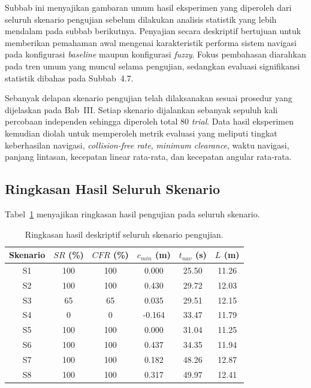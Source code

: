 Subbab ini menyajikan gambaran umum hasil eksperimen yang diperoleh dari seluruh skenario pengujian sebelum dilakukan analisis statistik yang lebih mendalam pada subbab berikutnya. Penyajian secara deskriptif bertujuan untuk memberikan pemahaman awal mengenai karakteristik performa sistem navigasi pada konfigurasi \textit{baseline} maupun konfigurasi \textit{fuzzy}. Fokus pembahasan diarahkan pada tren umum yang muncul selama pengujian, sedangkan evaluasi signifikansi statistik dibahas pada Subbab~4.7.

Sebanyak delapan skenario pengujian telah dilaksanakan sesuai prosedur yang dijelaskan pada Bab~III. Setiap skenario dijalankan sebanyak sepuluh kali percobaan independen sehingga diperoleh total 80 \textit{trial}. Data hasil eksperimen kemudian diolah untuk memperoleh metrik evaluasi yang meliputi tingkat keberhasilan navigasi, \textit{collision-free rate}, \textit{minimum clearance}, waktu navigasi, panjang lintasan, kecepatan linear rata-rata, dan kecepatan angular rata-rata.

\subsection{Ringkasan Hasil Seluruh Skenario}

Tabel~\ref{tab:ringkasan_hasil_deskriptif} menyajikan ringkasan hasil pengujian pada seluruh skenario.

\begin{table}[H]
\centering
\caption{Ringkasan hasil deskriptif seluruh skenario pengujian.}
\label{tab:ringkasan_hasil_deskriptif}
\begin{tabular}{cccccc}
\toprule
Skenario &
$SR$ (\%) &
$CFR$ (\%) &
$c_{min}$ (m) &
$t_{nav}$ (s) &
$L$ (m) \\
\midrule
S1 & 100 & 100 & 0.000 & 25.50 & 11.26 \\
S2 & 100 & 100 & 0.430 & 29.72 & 12.03 \\
S3 & 65  & 65  & 0.035 & 29.51 & 12.15 \\
S4 & 0   & 0   & -0.164 & 33.47 & 11.79 \\
S5 & 100 & 100 & 0.000 & 31.04 & 11.25 \\
S6 & 100 & 100 & 0.437 & 34.35 & 11.94 \\
S7 & 100 & 100 & 0.182 & 48.26 & 12.87 \\
S8 & 100 & 100 & 0.317 & 49.97 & 12.41 \\
\bottomrule
\end{tabular}
\end{table}

